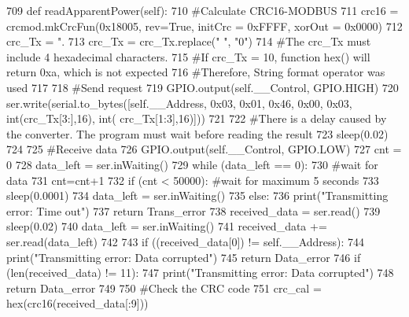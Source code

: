 \begin{DoxyCode}
709     \textcolor{keyword}{def }readApparentPower(self):
710         \textcolor{comment}{#Calculate CRC16-MODBUS
}
711         crc16 = crcmod.mkCrcFun(0x18005, rev=\textcolor{keyword}{True}, initCrc = 0xFFFF, xorOut = 0x0000)
712         crc\_Tx = \textcolor{stringliteral}{".%
713         crc\_Tx = crc\_Tx.replace(\textcolor{stringliteral}{" "}, \textcolor{stringliteral}{"0"})
714         \textcolor{comment}{#The crc\_Tx must include 4 hexadecimal characters.
}
715         \textcolor{comment}{#If crc\_Tx = 10, function hex() will return 0xa, which is not expected
}
716         \textcolor{comment}{#Therefore, String format operator was used
}
717     
718         \textcolor{comment}{#Send request
}
719         GPIO.output(self.\_\_Control, GPIO.HIGH)
720         ser.write(serial.to\_bytes([self.\_\_Address, 0x03, 0x01, 0x46, 0x00, 0x03, int(crc\_Tx[3:],16), int(
      crc\_Tx[1:3],16)]))
721         
722         \textcolor{comment}{#There is a delay caused by the converter. The program must wait before reading the result
}
723         sleep(0.02)
724     
725         \textcolor{comment}{#Receive data
}
726         GPIO.output(self.\_\_Control, GPIO.LOW)
727         cnt = 0
728         data\_left = ser.inWaiting()
729         \textcolor{keywordflow}{while} (data\_left == 0):
730             \textcolor{comment}{#wait for data
}
731             cnt=cnt+1
732             \textcolor{keywordflow}{if} (cnt < 50000): \textcolor{comment}{#wait for maximum 5 seconds
}
733                 sleep(0.0001)
734                 data\_left = ser.inWaiting()
735             \textcolor{keywordflow}{else}:
736                 print(\textcolor{stringliteral}{"Transmitting error: Time out"})
737                 \textcolor{keywordflow}{return} Trans\_error
738         received\_data = ser.read()
739         sleep(0.02)
740         data\_left = ser.inWaiting()
741         received\_data += ser.read(data\_left)
742         
743         \textcolor{keywordflow}{if} ((received\_data[0]) != self.\_\_Address):
744             print(\textcolor{stringliteral}{"Transmitting error: Data corrupted"})
745             \textcolor{keywordflow}{return} Data\_error
746         \textcolor{keywordflow}{if} (len(received\_data) != 11):
747             print(\textcolor{stringliteral}{"Transmitting error: Data corrupted"})
748             \textcolor{keywordflow}{return} Data\_error
749         
750         \textcolor{comment}{#Check the CRC code
}
751         crc\_cal = hex(crc16(received\_data[:9]))
}
\end{DoxyCode}
